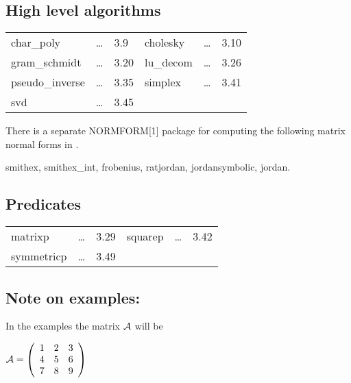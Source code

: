 \subsection{High level algorithms}

\begin{center}
\begin{tabular}{l l l l l l}
char\_poly       & \ldots & 3.9 &
cholesky         & \ldots & 3.10 \\
gram\_schmidt    & \ldots & 3.20 &
lu\_decom        & \ldots & 3.26 \\
pseudo\_inverse  & \ldots & 3.35 &
simplex          & \ldots & 3.41 \\
svd              & \ldots & 3.45 &
\end{tabular}
\end{center}

\vspace*{5mm}
There is a separate {\small NORMFORM}[1] package for computing
the following matrix normal forms in \REDUCE.

\begin{center}
smithex, smithex\_int, frobenius, ratjordan, jordansymbolic, jordan.
\end{center}

\subsection{Predicates}

\begin{center}
\begin{tabular}{l l l l l l}
matrixp     & \ldots & 3.29 &
squarep     & \ldots & 3.42 \\
symmetricp  & \ldots & 3.49 &
\end{tabular}
\end{center}

\subsection*{Note on examples:}

In the examples the matrix ${\cal A}$ will be

\begin{flushleft}
\begin{math}
{\cal A} = \left( \begin{array}{ccc} 1 & 2 & 3 \\ 4 & 5 & 6 \\ 7 & 8 & 9
\end{array} \right)
\end{math}
\end{flushleft}



